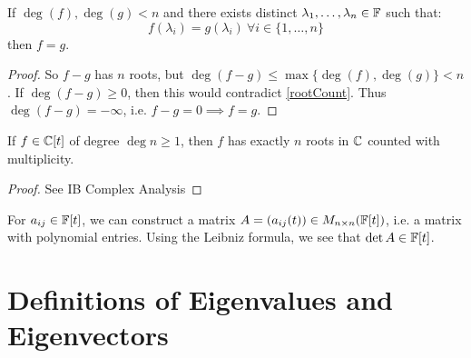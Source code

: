 \documentclass[../main.tex]{subfiles}
\begin{document}
\begin{corollary}
  If $\deg(f), \deg(g) < n$ and there exists distinct $\lambda_1, \ldots, \lambda_n \in \mathbb{F}$ such that:
  \[
    f(\lambda_i) = g(\lambda_i)\ \forall i \in \{1, \ldots, n\}
  \]
  then $f = g$.
\end{corollary}
\begin{proof}
  So $f - g$ has $n$ roots, but $\deg(f - g) \leq \max\{\deg(f), \deg(g)\} < n$.
  If $\deg(f - g) \geq 0$, then this would contradict \cref{rootCount}.
  Thus $\deg(f - g) = -\infty$, i.e. $f - g = 0 \implies f = g$.
\end{proof}
\begin{theorem}
  If $f \in \mathbb{C}[t]$ of degree $\deg n \geq 1$, then $f$ has exactly $n$ roots in $\mathbb{C}$ counted with multiplicity. \label{FTA}
\end{theorem}
\begin{proof}
  See IB Complex Analysis
\end{proof}
For $a_{i j} \in \mathbb{F}[t]$, we can construct a matrix $A = (a_{i j}(t)) \in M_{n \times n}(\mathbb{F}[t])$, i.e. a matrix with polynomial entries.
Using the Leibniz formula, we see that $\det A \in \mathbb{F}[t]$.
\section{Definitions of Eigenvalues and Eigenvectors}
\end{document}
